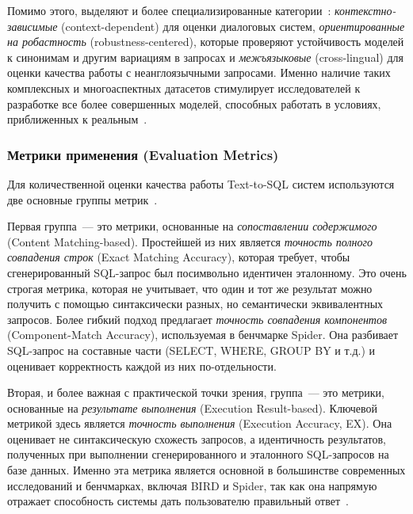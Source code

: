 Помимо этого, выделяют и более специализированные
категории~\cite{huangExploringLandscapeTexttoSQL2025}:
\textit{контекстно-зависимые} (context-dependent) для оценки диалоговых систем,
\textit{ориентированные на робастность} (robustness-centered), которые проверяют
устойчивость моделей к синонимам и другим вариациям в
запросах и \textit{межъязыковые} (cross-lingual) для оценки качества работы с
неанглоязычными запросами. Именно наличие таких комплексных и
многоаспектных датасетов стимулирует исследователей к разработке все более совершенных моделей,
способных работать в условиях, приближенных к реальным~\cite{mohammadjafariNaturalLanguageSQL2025,
      gaoPreviewXiYanSQLMultiGenerator2025}.

\subsubsection{Метрики применения (Evaluation Metrics)}

Для количественной оценки
качества работы Text-to-SQL систем используются две основные группы
метрик~\cite{huangExploringLandscapeTexttoSQL2025}.

Первая группа~--- это метрики,
основанные на \textit{сопоставлении содержимого} (Content Matching-based).
Простейшей из них является \textit{точность полного совпадения строк} (Exact Matching Accuracy),
которая требует, чтобы сгенерированный SQL-запрос был посимвольно идентичен эталонному.
Это очень строгая метрика, которая не учитывает, что один и тот же результат можно
получить с помощью синтаксически разных, но семантически эквивалентных запросов.
Более гибкий подход предлагает \textit{точность совпадения компонентов} (Component-Match Accuracy),
используемая в бенчмарке Spider. Она разбивает SQL-запрос на
составные части (SELECT, WHERE, GROUP BY и т.д.) и оценивает корректность
каждой из них по-отдельности.

Вторая, и более важная с практической точки зрения, группа~--- это метрики,
основанные на \textit{результате выполнения} (Execution Result-based).
Ключевой метрикой здесь является \textit{точность выполнения} (Execution Accuracy, EX).
Она оценивает не синтаксическую схожесть запросов, а идентичность результатов,
полученных при выполнении сгенерированного и эталонного SQL-запросов на базе данных.
Именно эта метрика является основной в большинстве современных исследований и бенчмарках,
включая BIRD и Spider, так как она напрямую отражает способность системы дать
пользователю правильный ответ~\cite{huangExploringLandscapeTexttoSQL2025,
      gaoPreviewXiYanSQLMultiGenerator2025}.


